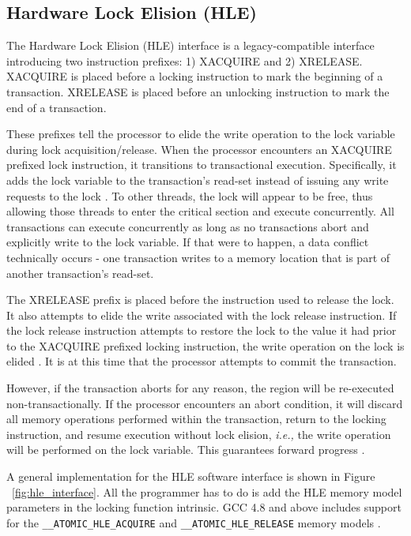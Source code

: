 \documentclass[11pt]{book}
\begin{document}
\subsection{Hardware Lock Elision (HLE)}\label{sec:hle}

The Hardware Lock Elision (HLE) interface is a legacy-compatible interface
introducing two instruction prefixes: 1) XACQUIRE and 2) XRELEASE.  XACQUIRE is
placed before a locking instruction to mark the beginning of a transaction.
XRELEASE is placed before an unlocking instruction to mark the end of a
transaction.

These prefixes tell the processor to elide the write operation to the lock variable during
lock acquisition/release.  When the processor encounters an XACQUIRE prefixed lock
instruction, it transitions to transactional execution.  Specifically, it adds the lock
variable to the transaction's read-set instead of issuing any write requests to the lock
\cite{intel_prog_ref}.  To other threads, the lock will appear to be free, thus allowing
those threads to enter the critical section and execute concurrently.  All transactions
can execute concurrently as long as no transactions abort and explicitly write to the
lock variable.  If that were to happen, a data conflict technically occurs - one
transaction writes to a memory location that is part of another transaction's read-set.

The XRELEASE prefix is placed before the instruction used to release the lock.  It also
attempts to elide the write associated with the lock release instruction.  If the lock
release instruction attempts to restore the lock to the value it had prior to the XACQUIRE
prefixed locking instruction, the write operation on the lock is elided
\cite{intel_prog_ref}.  It is at this time that the processor attempts to commit the
transaction.

However, if the transaction aborts for any reason, the region will be re-executed
non-transactionally.  If the processor encounters an abort condition, it will discard all
memory operations performed within the transaction, return to the locking instruction, and
resume execution without lock elision, \emph{i.e.,} the write operation will be performed on the
lock variable.  This guarantees forward progress \cite{intel_prog_ref}.

A general implementation for the HLE software interface is shown in Figure
~\ref{fig:hle_interface}.  All the programmer has to do is add the HLE memory model
parameters in the locking function intrinsic.  GCC 4.8 and above includes support for the
\texttt{\_\_ATOMIC\_HLE\_ACQUIRE} and \texttt{\_\_ATOMIC\_HLE\_RELEASE} memory models \cite{gcc}.
\end{document}
